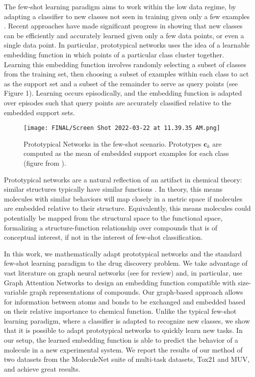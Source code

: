 \documentclass{article}
\begin{document}
The few-shot learning paradigm aims to work within the low data regime, by adapting a classifier to new classes not seen in training given only a few examples \cite{wang2020generalizing}.  Recent approaches \cite{DBLP:journals/corr/SnellSZ17,finn2017model,brown2020language,vinyals2016matching,ravi2016optimization} have made significant progress in showing that new classes can be efficiently and accurately learned given only a few data points, or even a single data point.  In particular, prototypical networks \cite{DBLP:journals/corr/SnellSZ17} uses the idea of a learnable embedding function in which points of a particular class cluster together. Learning this embedding function involves randomly selecting a subset of classes from the training set, then choosing a subset of examples within each class to act as the support set and a subset of the remainder to serve as query points (see Figure 1).  Learning occurs episodically, and the embedding function is adapted over episodes such that query points are accurately classified relative to the embedded support sets.

\begin{figure}
  \centering
  \texttt{[image: FINAL/Screen Shot 2022-03-22 at 11.39.35 AM.png]}
  \caption{Prototypical Networks in the few-shot scenario. Prototypes $\textbf{c}_k$ are computed as the mean of embedded support examples for each class (figure from \cite{DBLP:journals/corr/SnellSZ17}).}
\end{figure}

Prototypical networks are a natural reflection of an artifact in chemical theory: similar structures typically have similar functions \cite{clayden2012organic}.  In theory, this means molecules with similar behaviors will map closely in a metric space if molecules are embedded relative to their structure. Equivalently, this means molecules could potentially be mapped from the structural space to the functional space, formalizing a structure-function relationship over compounds that is of conceptual interest, if not in the interest of few-shot classification.  


In this work, we mathematically adapt prototypical networks and the standard few-shot learning paradigm to the drug discovery problem.  We take advantage of vast literature on graph neural networks (see \cite{zhou2020graph} for review) and, in particular, use Graph Attention Networks \cite{velickovic2017graph} to design an embedding function compatible with size-variable graph representations of compounds.  Our graph-based approach allows for information between atoms and bonds to be exchanged and embedded based on their relative importance to chemical function.  Unlike the typical few-shot learning paradigm, where a classifier is adapted to recognize new classes, we show that it is possible to adapt prototypical networks to quickly learn new tasks.  In our setup, the learned embedding function is able to predict the behavior of a molecule in a new experimental system.  We report the results of our method of two datasets from the MoleculeNet \cite{wu2018moleculenet} suite of multi-task datasets, Tox21 and MUV, and achieve great results.
\end{document}
